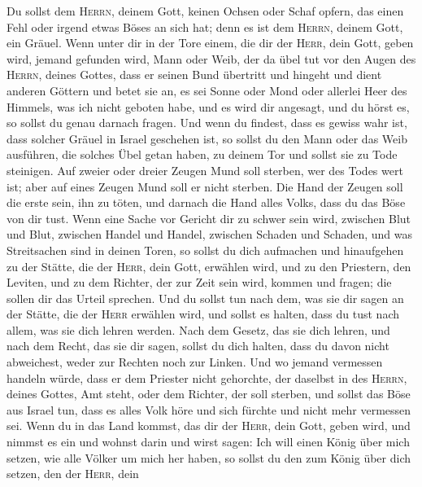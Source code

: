  Du sollst dem \textsc{Herrn}, deinem Gott, keinen Ochsen
oder Schaf opfern, das einen Fehl oder irgend etwas Böses an sich hat;
denn es ist dem \textsc{Herrn}, deinem Gott, ein Gräuel. 
Wenn unter dir in der Tore einem, die dir der \textsc{Herr}, dein Gott,
geben wird, jemand gefunden wird, Mann oder Weib, der da übel tut vor
den Augen des \textsc{Herrn}, deines Gottes, dass er seinen Bund
übertritt  und hingeht und dient anderen Göttern und betet
sie an, es sei Sonne oder Mond oder allerlei Heer des Himmels, was ich
nicht geboten habe,  und es wird dir angesagt, und du
hörst es, so sollst du genau darnach fragen. Und wenn du findest, dass
es gewiss wahr ist, dass solcher Gräuel in Israel geschehen ist,
 so sollst du den Mann oder das Weib ausführen, die
solches Übel getan haben, zu deinem Tor und sollst sie zu Tode
steinigen.  Auf zweier oder dreier Zeugen Mund soll
sterben, wer des Todes wert ist; aber auf eines Zeugen Mund soll er
nicht sterben.  Die Hand der Zeugen soll die erste sein,
ihn zu töten, und darnach die Hand alles Volks, dass du das Böse von dir
tust.  Wenn eine Sache vor Gericht dir zu schwer sein
wird, zwischen Blut und Blut, zwischen Handel und Handel, zwischen
Schaden und Schaden, und was Streitsachen sind in deinen Toren, so
sollst du dich aufmachen und hinaufgehen zu der Stätte, die der
\textsc{Herr}, dein Gott, erwählen wird,  und zu den
Priestern, den Leviten, und zu dem Richter, der zur Zeit sein wird,
kommen und fragen; die sollen dir das Urteil sprechen. 
Und du sollst tun nach dem, was sie dir sagen an der Stätte, die der
\textsc{Herr} erwählen wird, und sollst es halten, dass du tust nach
allem, was sie dich lehren werden.  Nach dem Gesetz, das
sie dich lehren, und nach dem Recht, das sie dir sagen, sollst du dich
halten, dass du davon nicht abweichest, weder zur Rechten noch zur
Linken.  Und wo jemand vermessen handeln würde, dass er
dem Priester nicht gehorchte, der daselbst in des \textsc{Herrn}, deines
Gottes, Amt steht, oder dem Richter, der soll sterben, und sollst das
Böse aus Israel tun,  dass es alles Volk höre und sich
fürchte und nicht mehr vermessen sei.  Wenn du in das
Land kommst, das dir der \textsc{Herr}, dein Gott, geben wird, und
nimmst es ein und wohnst darin und wirst sagen: Ich will einen König
über mich setzen, wie alle Völker um mich her haben,  so
sollst du den zum König über dich setzen, den der \textsc{Herr}, dein
